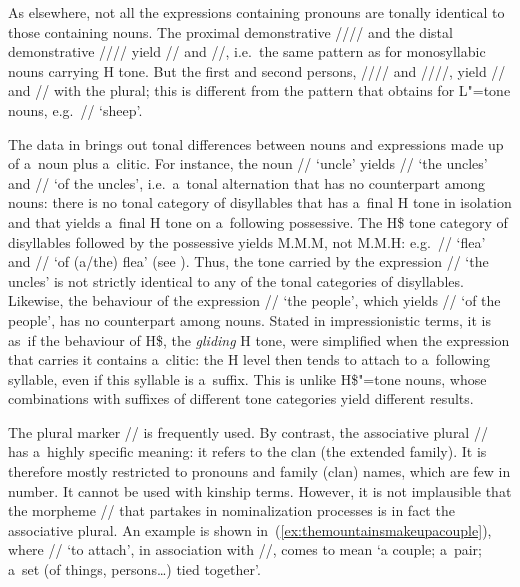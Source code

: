 As elsewhere, not all the expressions containing pronouns are tonally identical to those containing nouns. The proximal
demonstrative //// and the distal demonstrative
//// yield // and //, i.e.\ the same pattern as for {monosyllabic} nouns carrying H tone. But the first and second persons, ////
and ////, yield // and // with the plural; this is different from
the pattern that obtains for L"=tone nouns, e.g.~// ‘sheep’. 

The data in  brings out tonal differences between nouns and expressions made up of a~noun plus a~clitic. For instance, the noun // ‘uncle’ yields // ‘the uncles’ and // ‘of the uncles’, i.e.\ a~tonal alternation that has no counterpart among nouns: there is no tonal category of disyllables that has a~final H tone in isolation and that yields a~final H tone on a~following {possessive}. The H\$ tone category of disyllables followed by the {possessive} yields M.M.M, not M.M.H: e.g.~// ‘flea’ and // ‘of \mbox{(a/the)} flea’ (see ). Thus, the tone carried by the expression // ‘the uncles’ is not strictly identical to any of the tonal categories of disyllables. Likewise, the behaviour of the expression // ‘the people’, which yields // ‘of the people’, has no counterpart among nouns. Stated in impressionistic terms, it is as~if the behaviour of H\$, the \textit{gliding} H tone, were simplified when the expression that carries it contains a~clitic: the H level then tends to attach to a~following syllable, even if this syllable is a~suffix. This is unlike H\$"=tone nouns, whose combinations with suffixes of different tone categories yield different results. 

The plural marker // is frequently used. By contrast, the associative plural //
has a~highly specific meaning: it refers to the clan (the extended family). It is therefore
mostly restricted to pronouns and family (clan) names, which are few in number. It cannot be used
with kinship terms. However, it is not implausible that the morpheme // that partakes in nominalization processes is in fact the associative plural. An example is shown in~(\ref{ex:themountainsmakeupacouple}), where // ‘to attach’, in association
with //, comes to mean ‘a couple; a~pair; a~set (of things, persons{\dots}) tied
together’. 

